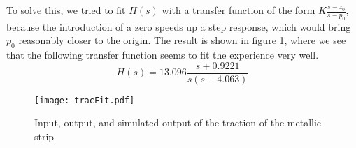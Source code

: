 To solve this, we tried to fit $H(s)$ with a transfer function of the form $K\frac{s-z_0}{s-p_0}$, because the introduction of a zero speeds up a step response, which would bring $p_0$ reasonably closer to the origin. The result is shown in figure \ref{fig:tracFit}, where we see that the following transfer function seems to fit the experience very well.
\[H(s) = 13.096\frac{s+0.9221}{s(s+4.063)}\]
\begin{figure}[htbp]
\centering
\texttt{[image: tracFit.pdf]}
\caption{Input, output, and simulated output of the traction of the metallic strip\label{fig:tracFit}}
\end{figure}

